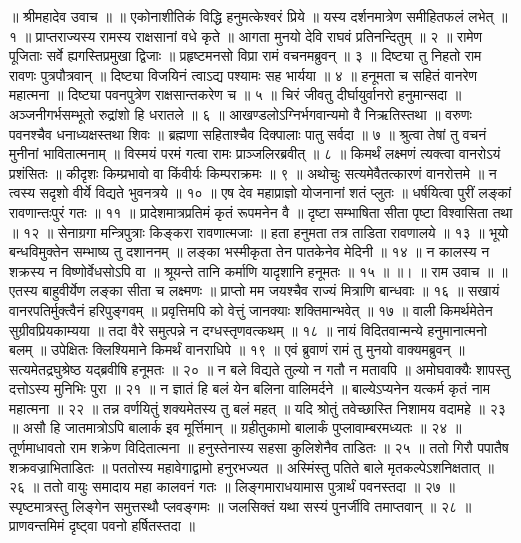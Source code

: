 ॥ श्रीमहादेव उवाच ॥ ॥
एकोनाशीतिकं विद्धि हनुमत्केश्वरं प्रिये ॥
यस्य दर्शनमात्रेण समीहितफलं लभेत् ॥ १ ॥
प्राप्तराज्यस्य रामस्य राक्षसानां वधे कृते ॥
आगता मुनयो देवि राघवं प्रतिनन्दितुम् ॥ २ ॥
रामेण पूजिताः सर्वे ह्यगस्तिप्रमुखा द्विजाः ॥
प्रहृष्टमनसो विप्रा रामं वचनमब्रुवन् ॥ ३ ॥
दिष्ट्या तु निहतो राम रावणः पुत्रपौत्रवान् ॥
दिष्ट्या विजयिनं त्वाऽद्य पश्यामः सह भार्यया ॥ ४ ॥
हनूमता च सहितं वानरेण महात्मना ॥
दिष्ट्या पवनपुत्रेण राक्षसान्तकरेण च ॥ ५ ॥
चिरं जीवतु दीर्घायुर्वानरो हनुमान्सदा ॥
अञ्जनीगर्भसम्भूतो रुद्रांशो हि धरातले ॥ ६ ॥
आखण्डलोऽग्निर्भगवान्यमो वै निऋतिस्तथा ॥
वरुणः पवनश्चैव धनाध्यक्षस्तथा शिवः ॥
ब्रह्मणा सहिताश्चैव दिक्पालाः पातु सर्वदा ॥ ७ ॥
श्रुत्वा तेषां तु वचनं मुनीनां भावितात्मनाम् ॥
विस्मयं परमं गत्वा रामः प्राञ्जलिरब्रवीत् ॥ ८ ॥
किमर्थं लक्ष्मणं त्यक्त्वा वानरोऽयं प्रशंसितः ॥
कीदृशः किम्प्रभावो वा किंवीर्यः किम्पराक्रमः ॥ ९ ॥
अथोचुः सत्यमेवैतत्कारणं वानरोत्तमे ॥
न त्वस्य सदृशो वीर्ये विद्यते भुवनत्रये ॥ १० ॥
एष देव महाप्राज्ञो योजनानां शतं प्लुतः ॥
धर्षयित्वा पुरीं लङ्कां रावणान्तःपुरं गतः ॥ ११ ॥
प्रादेशमात्रप्रतिमं कृतं रूपमनेन वै ॥
दृष्टा सम्भाषिता सीता पृष्टा विश्वासिता तथा ॥ १२ ॥
सेनाग्रगा मन्त्रिपुत्राः किङ्करा रावणात्मजाः ॥
हता हनुमता तत्र ताडिता रावणालये ॥ १३ ॥
भूयो बन्धविमुक्तेन सम्भाष्य तु दशाननम् ॥
लङ्का भस्मीकृता तेन पातकेनेव मेदिनी ॥ १४ ॥
न कालस्य न शक्रस्य न विष्णोर्वेधसोऽपि वा ॥
श्रूयन्ते तानि कर्माणि यादृशानि हनूमतः ॥ १५ ॥ ॥।
॥ राम उवाच ॥ ॥
एतस्य बाहुवीर्येण लङ्का सीता च लक्ष्मणः ॥
प्राप्तो मम जयश्चैव राज्यं मित्राणि बान्धवाः ॥ १६ ॥
सखायं वानरपतिर्मुक्त्वैनं हरिपुङ्गवम् ॥
प्रवृत्तिमपि को वेत्तुं जानक्याः शक्तिमान्भवेत् ॥ १७ ॥
वाली किमर्थमेतेन सुग्रीवप्रियकाम्यया ॥
तदा वैरे समुत्पन्ने न दग्धस्तृणवत्कथम् ॥ १८ ॥
नायं विदितवान्मन्ये हनुमानात्मनो बलम् ॥
उपेक्षितः क्लिश्यिमाने किमर्थं वानराधिपे ॥ १९ ॥
एवं ब्रुवाणं रामं तु मुनयो वाक्यमब्रुवन् ॥
सत्यमेतद्रघुश्रेष्ठ यद्ब्रवीषि हनूमतः ॥ २० ॥
न बले विद्यते तुल्यो न गतौ न मतावपि ॥
अमोघवाक्यैः शापस्तु दत्तोऽस्य मुनिभिः पुरा ॥ २१ ॥
न ज्ञातं हि बलं येन बलिना वालिमर्दने ॥
बाल्येऽप्यनेन यत्कर्म कृतं नाम महात्मना ॥ २२ ॥
तन्न वर्णयितुं शक्यमेतस्य तु बलं महत् ॥
यदि श्रोतुं तवेच्छास्ति निशामय वदामहे ॥ २३ ॥
असौ हि जातमात्रोऽपि बालार्क इव मूर्त्तिमान् ॥
ग्रहीतुकामो बालार्कं पुप्लावाम्बरमध्यतः ॥ २४ ॥
तूर्णमाधावतो राम शक्रेण विदितात्मना ॥
हनुस्तेनास्य सहसा कुलिशेनैव ताडितः ॥ २५ ॥
ततो गिरौ पपातैष शक्रवज्राभिताडितः ॥
पततोस्य महावेगाद्वामो हनुरभज्यत ॥
अस्मिंस्तु पतिते बाले मृतकल्पेऽशनिक्षतात् ॥ २६ ॥
ततो वायुः समादाय महा कालवनं गतः ॥
लिङ्गमाराधयामास पुत्रार्थं पवनस्तदा ॥ २७ ॥
स्पृष्टमात्रस्तु लिङ्गेन समुत्तस्थौ प्लवङ्गमः ॥
जलसिक्तं यथा सस्यं पुनर्जीवि तमाप्तवान् ॥ २८ ॥
प्राणवन्तमिमं दृष्ट्वा पवनो हर्षितस्तदा ॥
